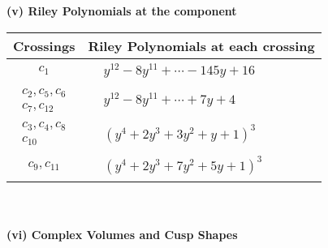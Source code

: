 \documentclass[1p]{elsarticle_modified}
\theoremstyle{definition}
\begin{document}
\newpage\renewcommand{\arraystretch}{1}
\flushleft \textbf{(v) Riley Polynomials at the component}\newline \\
\begin{tabular}{m{50pt}|m{274pt}}
Crossings & \hspace{64pt}Riley Polynomials at each crossing \\
\hline $$\begin{aligned}c_{1}\end{aligned}$$&$\begin{aligned}
&y^{12}-8 y^{11}+\cdots-145 y+16
\end{aligned}$\\
\hline $$\begin{aligned}c_{2},c_{5},c_{6}\\c_{7},c_{12}\end{aligned}$$&$\begin{aligned}
&y^{12}-8 y^{11}+\cdots+7 y+4
\end{aligned}$\\
\hline $$\begin{aligned}c_{3},c_{4},c_{8}\\c_{10}\end{aligned}$$&$\begin{aligned}
&(y^4+2 y^3+3 y^2+y+1)^3
\end{aligned}$\\
\hline $$\begin{aligned}c_{9},c_{11}\end{aligned}$$&$\begin{aligned}
&(y^4+2 y^3+7 y^2+5 y+1)^3
\end{aligned}$\\
\hline
\end{tabular}\\~\\
\newpage\flushleft \textbf{(vi) Complex Volumes and Cusp Shapes}
\end{document}
